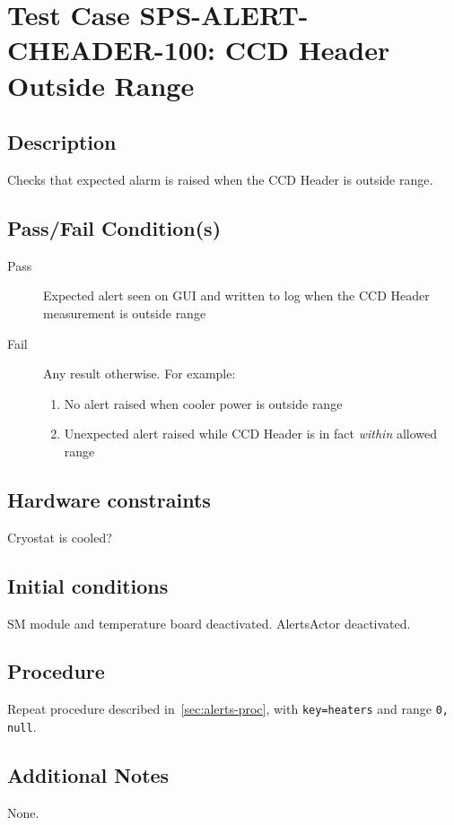 \section{Test Case SPS-ALERT-CHEADER-100: CCD Header Outside Range}

\subsection{Description}

Checks that expected alarm is raised when the CCD Header is outside range.

\subsection{Pass/Fail Condition(s)}

\begin{description}
\item [Pass] Expected alert seen on GUI and written to log when the CCD Header measurement is outside range
\item [Fail] Any result otherwise. For example:

\begin{enumerate}
    \item No alert raised when cooler power is outside range
    \item Unexpected alert raised while CCD Header is in fact {\it within} allowed range
\end{enumerate}
\end{description}

\subsection{Hardware constraints}

Cryostat is cooled?

\subsection{Initial conditions}

SM module and temperature board deactivated. AlertsActor deactivated.

\subsection{Procedure}

Repeat procedure described in~\ref{sec:alerts-proc}, with \texttt{key=heaters} and range \texttt{0, null}.

\subsection{Additional Notes}
None.
